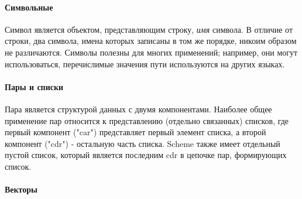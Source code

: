 
\paragraph{Символьные}

Символ является объектом, представляющим строку, \textit{имя} символа. В отличие от строки, два символа,
имена которых записаны в том же порядке, никоим образом не различаются. Символы полезны для
многих применений; например, они могут использоваться, перечислимые значения пути
используются на других языках.

\paragraph{Пары и списки}

Пара является структурой данных с двумя компонентами. Наиболее общее применение пар относится
к представлению (отдельно связанных) списков, где первый компонент ("car") представляет первый
элемент списка, а второй компонент ("cdr") - остальную часть списка. Scheme также имеет
отдельный пустой список, который является последним cdr в цепочке пар, формирующих
список.

\paragraph{Векторы}

